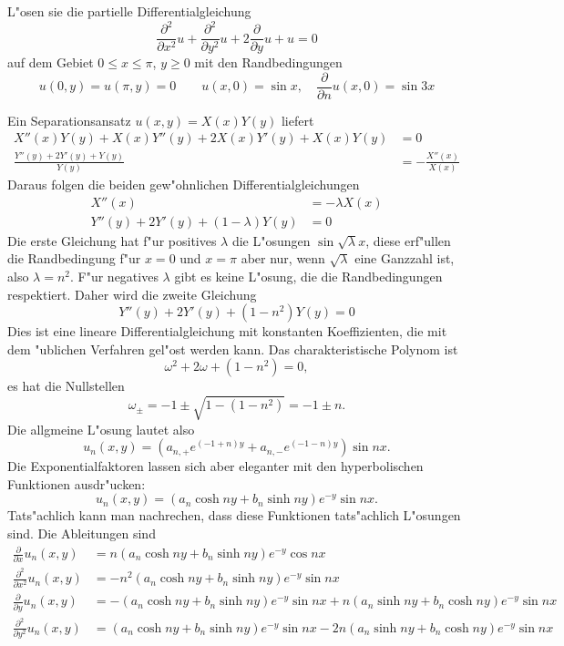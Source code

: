 L"osen sie die partielle Differentialgleichung
\[
\frac{\partial^2}{\partial x^2}u+\frac{\partial^2}{\partial y^2}u
+2\frac{\partial }{\partial y}u+u=0
\]
auf dem Gebiet $0\le x\le \pi$, $y\ge 0$ mit den Randbedingungen
\[
u(0,y)=u(\pi,y)=0
\quad
\quad
u(x,0)=\sin x,\quad \frac{\partial }{\partial n}u(x,0)=\sin 3x
\]

\begin{loesung}
Ein Separationsansatz $u(x,y)=X(x)Y(y)$ liefert
\begin{align*}
X''(x)Y(y)+X(x)Y''(y)+2X(x)Y'(y)+X(x)Y(y)&=0
\\
\frac{Y''(y)+2Y'(y)+Y(y)}{Y(y)}
&=
-\frac{X''(x)}{X(x)}
\end{align*}
Daraus folgen die beiden gew"ohnlichen Differentialgleichungen
\begin{align*}
X''(x)&=-\lambda X(x)\\
Y''(y)+2Y'(y)+(1-\lambda)Y(y)&=0
\end{align*}
Die erste Gleichung hat f"ur positives $\lambda$ die L"osungen
$\sin\sqrt{\lambda}x$, diese erf"ullen die Randbedingung f"ur $x=0$
und $x=\pi$ aber nur, wenn $\sqrt{\lambda}$ eine Ganzzahl ist, also
$\lambda=n^2$. F"ur negatives $\lambda$ gibt es keine L"osung,
die die Randbedingungen respektiert. Daher wird die zweite Gleichung
\[
Y''(y)+2Y'(y)+(1-n^2)Y(y)=0
\]
Dies ist eine lineare Differentialgleichung mit konstanten
Koeffizienten, die mit dem "ublichen Verfahren gel"ost werden
kann. Das charakteristische Polynom ist
\[
\omega^2+2\omega+(1-n^2)=0,
\]
es hat die Nullstellen
\[
\omega_{\pm}=-1\pm{\sqrt{1-(1-n^2)}}=-1\pm n.
\]
Die allgmeine L"osung lautet also
\[
u_n(x,y)=(a_{n,+}e^{(-1+n)y}+a_{n,-}e^{(-1-n)y})\sin nx.
\]
Die Exponentialfaktoren lassen sich aber eleganter
mit den hyperbolischen Funktionen ausdr"ucken:
\[
u_n(x,y)=(a_n\cosh ny+b_n\sinh ny)e^{-y}\sin nx.
\]
Tats"achlich kann man nachrechen, dass diese Funktionen
tats"achlich L"osungen sind. Die Ableitungen sind
\begin{align*}
\frac{\partial}{\partial x}u_n(x,y)
&=
n (a_n\cosh ny+b_n\sinh ny)e^{-y}\cos nx
\\
\frac{\partial^2}{\partial x^2}u_n(x,y)
&=
-n^2 (a_n\cosh ny+b_n\sinh ny)e^{-y}\sin nx
\\
\frac{\partial}{\partial y}u_n(x,y)
&=
-(a_n\cosh ny+b_n\sinh ny)e^{-y}\sin nx
+
n(a_n\sinh ny+b_n\cosh ny)e^{-y}\sin nx
\\
\frac{\partial^2}{\partial y^2}u_n(x,y)
&=
(a_n\cosh ny+b_n\sinh ny)e^{-y}\sin nx
-2n(a_n\sinh ny+b_n\cosh ny)e^{-y}\sin nx
\\

\end{align*}
\end{loesung}
